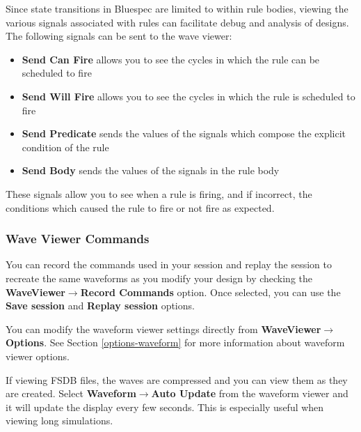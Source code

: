 \documentclass{article}
\begin{document}

Since state transitions in Bluespec are limited to within rule bodies,
viewing the various signals associated with rules can facilitate debug
and analysis of designs.  
The following signals  can be sent to the wave viewer:

\begin{itemize}
\item {\bf Send Can Fire} allows you to see the cycles in which the rule can be
scheduled to fire
\item {\bf Send Will Fire} allows you to see the cycles in which the
rule is scheduled to fire
\item {\bf Send Predicate} sends the values of the signals which
compose the explicit condition of the rule
\item {\bf Send Body} sends the values of the signals in the rule body
\end{itemize} 

These signals allow you to see when a rule is firing, and if
incorrect, the conditions which caused the rule to fire or not fire
as expected.


\subsubsection{Wave Viewer Commands}
You can record the commands used in your session and replay the
session to recreate the same waveforms as you modify your design by
checking the  {\bf WaveViewer$\rightarrow$Record Commands} option.  Once
selected,  you can  use the {\bf Save session}  and {\bf
Replay session} options.


You can modify the waveform viewer settings directly from {\bf
WaveViewer$\rightarrow$Options}.  See Section \ref{options-waveform}
for more information about waveform viewer options.

If viewing FSDB files, the waves are compressed and you can view them
as they are created.  Select {\bf Waveform$\rightarrow$Auto Update}
from the waveform viewer and it will update the display every few
seconds.  This is especially useful when viewing long simulations.

\end{document}

